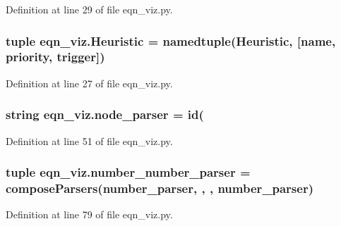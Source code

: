 Definition at line 29 of file eqn\+\_\+viz.\+py.

\hypertarget{namespaceeqn__viz_a0e6b1a683d662dd566b0cece84265fae}{}
\subsubsection[{Heuristic}]{\setlength{\rightskip}{0pt plus 5cm}tuple eqn\+\_\+viz.\+Heuristic = namedtuple(\textquotesingle{}Heuristic\textquotesingle{}, \mbox{[}\textquotesingle{}name\textquotesingle{}, \textquotesingle{}priority\textquotesingle{}, \textquotesingle{}trigger\textquotesingle{}\mbox{]})}\label{namespaceeqn__viz_a0e6b1a683d662dd566b0cece84265fae}


Definition at line 27 of file eqn\+\_\+viz.\+py.

\hypertarget{namespaceeqn__viz_aa3f9b7373809e0e391e1383fd878b616}{}
\subsubsection[{node\+\_\+parser}]{\setlength{\rightskip}{0pt plus 5cm}string eqn\+\_\+viz.\+node\+\_\+parser = \textquotesingle{}id(\textquotesingle{}}\label{namespaceeqn__viz_aa3f9b7373809e0e391e1383fd878b616}


Definition at line 51 of file eqn\+\_\+viz.\+py.

\hypertarget{namespaceeqn__viz_ae9d46b4030dff778fd4a908af15b1461}{}
\subsubsection[{number\+\_\+number\+\_\+parser}]{\setlength{\rightskip}{0pt plus 5cm}tuple eqn\+\_\+viz.\+number\+\_\+number\+\_\+parser = {\bf compose\+Parsers}({\bf number\+\_\+parser}, \textquotesingle{},\textquotesingle{} , {\bf number\+\_\+parser})}\label{namespaceeqn__viz_ae9d46b4030dff778fd4a908af15b1461}


Definition at line 79 of file eqn\+\_\+viz.\+py.

\hypertarget{namespaceeqn__viz_a5e65c3435a54324008033d990d858e72}{}
